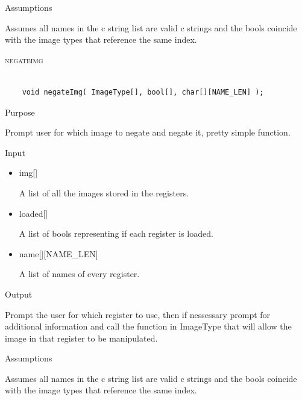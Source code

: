 \documentclass[pdftex, 11pt]{article}
\begin{document}
\begin{description}
\begin{description}
			\item{Assumptions}

				Assumes all names in the c string list are valid c
				strings and the bools coincide with the image types that
				reference the same index.

		\end{description}



	\item{\textsc{negateimg}}

		\begin{lstlisting}

	void negateImg( ImageType[], bool[], char[][NAME_LEN] );
		\end{lstlisting}

		\begin{description}
			\item{Purpose}

				Prompt user for which image to negate and negate it, pretty simple function.

			\item{Input}

				\begin{itemize}

					\item{img[]}

						A list of all the images stored in the registers.

					\item{loaded[]}

						A list of bools representing if each register is loaded.

					\item{name[][NAME\_LEN]}

						A list of names of every register.

				\end{itemize}

			\item{Output}

				Prompt the user for which register to use, then if nessessary
				prompt for additional information and call the function
				in ImageType that will allow the image in that register to
				be manipulated.

			\item{Assumptions}

				Assumes all names in the c string list are valid c
				strings and the bools coincide with the image types that
				reference the same index.


\end{description}
\end{description}
\end{document}
